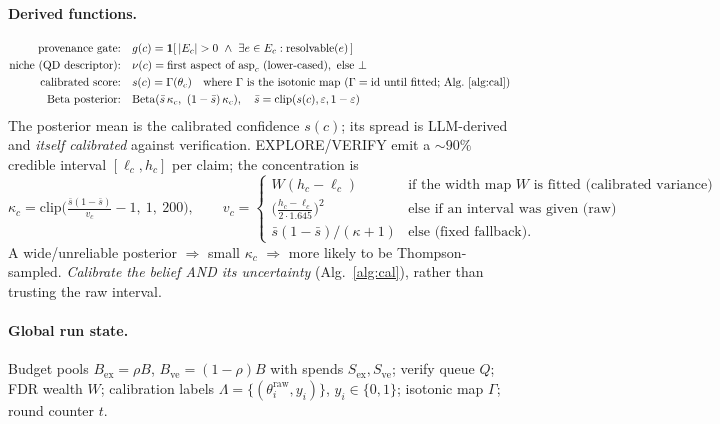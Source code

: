\documentclass[11pt]{article}
\newcommand{\Labels}{\Lambda}
\newcommand{\Queue}{Q}
\newcommand{\niche}{\nu}
\newcommand{\score}{s}
\newcommand{\grad}{g}
\newcommand{\Bex}{B_{\mathrm{ex}}}
\newcommand{\Bve}{B_{\mathrm{ve}}}
\newcommand{\indic}[1]{\mathbf{1}\!\left[#1\right]}
\begin{document}
\paragraph{Derived functions.}
\begin{align*}
\text{provenance gate:}\quad & \grad(c)=\indic{\,|E_c|>0\ \wedge\ \exists e\in E_c:\mathrm{resolvable}(e)\,}\\
\text{niche (QD descriptor):}\quad & \niche(c)=\text{first aspect of }\mathrm{asp}_c\ \text{(lower-cased)},\ \text{else }\bot\\
\text{calibrated score:}\quad & \score(c)=\Gamma(\theta_c)\quad\text{where }\Gamma\ \text{is the isotonic map (}\Gamma=\mathrm{id}\text{ until fitted; Alg.~\ref{alg:cal})}\\
\text{Beta posterior:}\quad & \mathrm{Beta}(\bar s\,\kappa_c,\ (1-\bar s)\,\kappa_c),\quad \bar s=\mathrm{clip}(\score(c),\varepsilon,1-\varepsilon)
\end{align*}
The posterior mean is the calibrated confidence $\score(c)$; its spread is LLM-derived and \emph{itself
calibrated} against verification. EXPLORE/VERIFY emit a $\sim\!90\%$ credible interval $[\ell_c,h_c]$ per
claim; the concentration is
\[
\kappa_c=\mathrm{clip}\!\Big(\tfrac{\bar s(1-\bar s)}{v_c}-1,\ 1,\ 200\Big),\qquad
v_c=\begin{cases}
W(h_c-\ell_c) & \text{if the width map $W$ is fitted (calibrated variance)}\\
\big(\tfrac{h_c-\ell_c}{2\cdot1.645}\big)^2 & \text{else if an interval was given (raw)}\\
\bar s(1-\bar s)/(\kappa+1) & \text{else (fixed fallback).}
\end{cases}
\]
A wide/unreliable posterior $\Rightarrow$ small $\kappa_c$ $\Rightarrow$ more likely to be Thompson-sampled.
\emph{Calibrate the belief AND its uncertainty} (Alg.~\ref{alg:cal}), rather than trusting the raw interval.

\paragraph{Global run state.}
Budget pools $\Bex=\rho B$, $\Bve=(1-\rho)B$ with spends $S_{\mathrm{ex}},S_{\mathrm{ve}}$; verify queue
$\Queue$; FDR wealth $W$; calibration labels $\Labels=\{(\theta^{\mathrm{raw}}_i,y_i)\}$, $y_i\in\{0,1\}$;
isotonic map $\Gamma$; round counter $t$.
\end{document}
